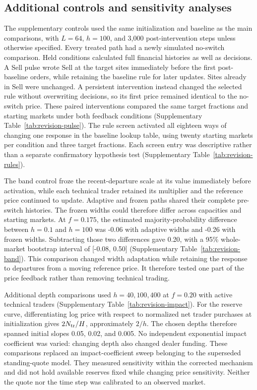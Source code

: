 \subsection{Additional controls and sensitivity analyses}
\label{app:revision-controls}

The supplementary controls used the same initialization and baseline as
the main comparisons, with $L=64$, $h=100$, and 3,000 post-intervention
steps unless otherwise specified. Every treated path had a newly
simulated no-switch comparison. Held conditions calculated full
financial histories as well as decisions. A Sell pulse wrote Sell
at the target sites immediately before the first post-baseline orders,
while retaining the baseline rule for later updates. Sites already in
Sell were unchanged. A persistent intervention instead changed the
selected rule without overwriting decisions, so its first price remained
identical to the no-switch price. These paired interventions compared
the same target fractions and starting markets under both feedback
conditions (Supplementary Table~\ref{tab:revision-pulse}). The rule
screen activated all eighteen ways of changing one response in the
baseline lookup table, using twenty starting markets per condition
and three target fractions. Each screen entry was descriptive rather
than a separate confirmatory hypothesis test
(Supplementary Table~\ref{tab:revision-rules}).

The band control froze the recent-departure scale at its value immediately
before activation, while each technical trader retained its multiplier
and the reference price continued to update. Adaptive and frozen paths
shared their complete pre-switch histories. The frozen widths could
therefore differ across capacities and starting markets. At $f=0.175$,
the estimated majority-probability difference between $h=0.1$ and
$h=100$ was -0.06 with adaptive widths and -0.26 with
frozen widths. Subtracting those two differences gave
0.20, with a 95\% whole-market bootstrap interval of
[-0.08, 0.50] (Supplementary Table~\ref{tab:revision-band}).
This comparison changed width adaptation while retaining the response
to departures from a moving reference price. It therefore tested one
part of the price feedback rather than removing technical trading.

Additional depth comparisons used $h=40,100,400$ at $f=0.20$ with
active technical traders (Supplementary Table~\ref{tab:revision-impact}).
For the reserve curve, differentiating log price with respect to
normalized net trader purchases at initialization gives $2N_{\rm tr}/H$,
approximately $2/h$. The chosen depths therefore spanned initial slopes
0.05, 0.02, and 0.005. No independent exponential impact coefficient
was varied: changing depth also changed dealer funding. These
comparisons replaced an impact-coefficient sweep belonging to the
superseded standing-quote model. They measured sensitivity within the
corrected mechanism and did not hold available reserves fixed while
changing price sensitivity. Neither the quote nor the time step was
calibrated to an observed market.

